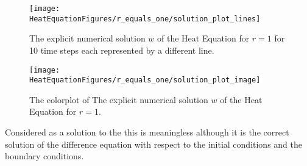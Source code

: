 \begin{example}
\begin{figure}[H]
  \caption{The explicit numerical solution $w$ of the Heat Equation for $r=1$ for 10 time steps each represented by a different line.}
  \centering
    \texttt{[image: HeatEquationFigures/r\_equals\_one/solution\_plot\_lines]}
\end{figure}


\begin{figure}[H]
  \caption{The colorplot of The explicit numerical solution $w$ of the Heat Equation for $r=1$.}
  \centering
    \texttt{[image: HeatEquationFigures/r\_equals\_one/solution\_plot\_image]}
\end{figure}

Considered as a solution to the  this is meaningless although it is the correct
solution of the difference equation with respect to the initial conditions and the boundary conditions.
\end{example}
